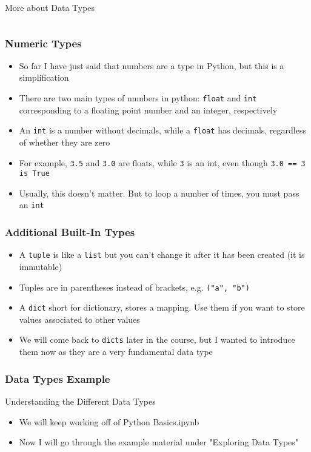 \documentclass[handout, 11pt]{beamer}
\begin{document}
\begin{section}{More about Data Types}
\begin{frame}[fragile]
\begin{block}
\begin{verbatim}
\end{verbatim}
\end{block}
\end{frame}
\begin{frame}
\frametitle{Numeric Types}
\begin{itemize}
\item So far I have just said that numbers are a type in Python, but this is a simplification
\vfill
\item There are two main types of numbers in python:
\texttt{float}
and
\texttt{int}
corresponding to a floating point number and an integer, respectively
\vfill
\item An
\texttt{int}
is a number without decimals, while a
\texttt{float}
has decimals, regardless of whether they are zero
\vfill
\item For example,
\texttt{3.5}
and
\texttt{3.0}
are floats, while
\texttt{3}
is an int, even though
\texttt{3.0 == 3 is True}
\vfill
\item Usually, this doesn't matter. But to loop a number of times, you must pass an
\texttt{int}
\end{itemize}
\end{frame}
\begin{frame}
\frametitle{Additional Built-In Types}
\begin{itemize}
\item A
\texttt{tuple}
is like a
\texttt{list}
but you can't change it after it has been created (it is immutable)
\vfill
\item Tuples are in parentheses instead of brackets, e.g.
\texttt{("a", "b")}
\vfill
\item A
\texttt{dict}
short for dictionary, stores a mapping. Use them if you want to store values associated to other values
\vfill
\item We will come back to
\texttt{dicts}
later in the course, but I wanted to
introduce them now as they are a very fundamental data type
\end{itemize}
\end{frame}
\begin{frame}
\frametitle{Data Types Example}
{
\begin{block}{Understanding the Different Data Types}
\begin{itemize}
\item We will keep working off of Python Basics.ipynb
\item Now I will go through the example material under "Exploring Data Types"

\end{itemize}
\end{block}}
\end{frame}
\end{section}
\end{document}
